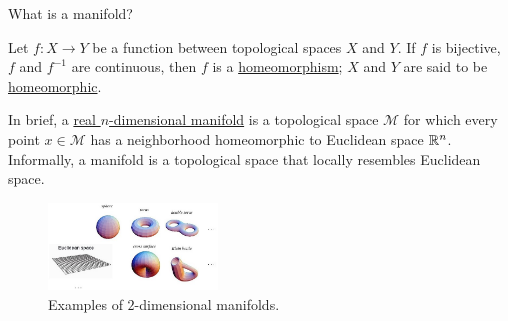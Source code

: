 \documentclass[xcolor={dvipsnames,svgnames}]{beamer}
\begin{document}
\begin{frame}{What is a manifold?}
\begin{defn}[Homeomorphism]
Let $f: X \to Y$ be a function between topological spaces $X$ and $Y$. If $f$ is bijective, $f$ and $f^{-1}$ are continuous, then $f$ is a \underline{homeomorphism}; $X$ and $Y$ are said to be \underline{homeomorphic}.
\end{defn}
    \begin{defn}[Manifold]
   In brief, a \underline{real $n$-dimensional manifold} is a topological space $\mathcal{M}$ for which every point $x\in\mathcal{M}$ has a neighborhood homeomorphic to Euclidean space $\mathbb R^n$. Informally, a manifold is a topological space that locally resembles Euclidean space.
    \end{defn}
   \begin{figure}[H]
      \centering
     \includegraphics[width=0.4\textwidth]{figures/intro/manifold.jpg}
     \caption{Examples of $2$-dimensional manifolds.}
    \end{figure} 
\end{frame}
\end{document}
